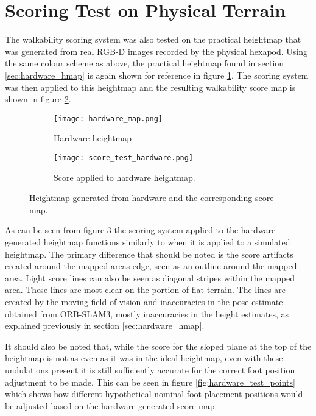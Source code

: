     \newpage
    \section{Scoring Test on Physical Terrain}
        The walkability scoring system was also tested on the practical heightmap that was generated from real RGB-D images recorded by the physical hexapod. Using the same colour scheme as above, the practical heightmap found in section \ref{sec:hardware_hmap} is again shown for reference in figure \ref{fig:harware_hmap}. The scoring system was then applied to this heightmap and the resulting walkability score map is shown in figure \ref{fig:hardware_score_map}.
        \begin{figure}[h]
            \centering
            \begin{subfigure}{.45\textwidth}
                \texttt{[image: hardware\_map.png]}
                \caption{Hardware heightmap}
                \label{fig:harware_hmap}
            \end{subfigure}%
            \begin{subfigure}{.45\textwidth}
                \texttt{[image: score\_test\_hardware.png]}
                \caption{Score applied to hardware heightmap.}
                \label{fig:hardware_score_map}
            \end{subfigure}
            \caption{Heightmap generated from hardware and the corresponding score map.}
            \label{fig:hardware_hmap_scoremap}
        \end{figure}

        \noindent
        As can be seen from figure \ref{fig:hardware_hmap_scoremap} the scoring system applied to the hardware-generated heightmap functions similarly to when it is applied to a simulated heightmap. The primary difference that should be noted is the score artifacts created around the mapped areas edge, seen as an outline around the mapped area. Light score lines can also be seen as diagonal stripes within the mapped area. These lines are most clear on the portion of flat terrain. The lines are created by the moving field of vision and inaccuracies in the pose estimate obtained from ORB-SLAM3, mostly inaccuracies in the height estimates, as explained previously in section \ref{sec:hardware_hmap}.

        It should also be noted that, while the score for the sloped plane at the top of the heightmap is not as even as it was in the ideal heightmap, even with these undulations present it is still sufficiently accurate for the correct foot position adjustment to be made. This can be seen in figure \ref{fig:hardware_test_points} which shows how different hypothetical nominal foot placement positions would be adjusted based on the hardware-generated score map.

